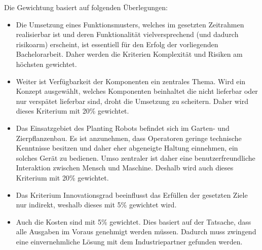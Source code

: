 Die Gewichtung basiert auf folgenden Überlegungen:
\begin{itemize}
	\item Die Umsetzung eines Funktionsmusters, welches im gesetzten Zeitrahmen realisierbar ist und deren Funktionalität vielversprechend (und dadurch risikoarm) erscheint, ist essentiell für den Erfolg der vorliegenden Bachelorarbeit. Daher werden die Kriterien Komplexität und Risiken am höchsten gewichtet.
	
	\item Weiter ist Verfügbarkeit der Komponenten ein zentrales Thema. Wird ein Konzept ausgewählt, welches Komponenten beinhaltet die nicht lieferbar oder nur verspätet lieferbar sind, droht die Umsetzung zu scheitern. Daher wird dieses Kriterium mit 20\% gewichtet.
	
	\item Das Einsatzgebiet des Planting Robots befindet sich im Garten- und Zierpflanzenbau. Es ist anzunehmen, dass Operatoren geringe technische Kenntnisse besitzen und daher eher abgeneigte Haltung einnehmen, ein solches Gerät zu bedienen. Umso zentraler ist daher eine benutzerfreundliche Interaktion zwischen Mensch und Maschine. Deshalb wird auch dieses Kriterium mit 20\% gewichtet.
	
	\item Das Kriterium Innovationsgrad beeinflusst das Erfüllen der gesetzten Ziele nur indirekt, weshalb dieses mit 5\% gewichtet wird. 
	
	\item Auch die Kosten sind mit 5\% gewichtet. Dies basiert auf der Tatsache, dass alle Ausgaben im Voraus genehmigt werden müssen. Dadurch muss zwingend eine einvernehmliche Lösung mit dem Industriepartner gefunden werden.
\end{itemize}
\newpage
